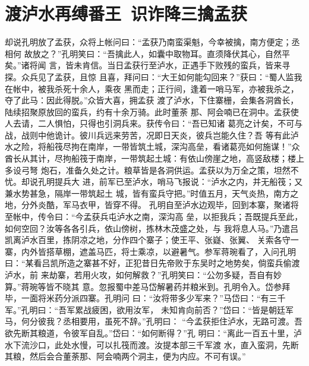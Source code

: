 \chapter{渡泸水再缚番王~识诈降三擒孟获}

却说孔明放了孟获，众将上帐问曰：“孟获乃南蛮渠魁，今幸被擒，南方便定；丞相何
故放之？”孔明笑曰：“吾擒此人，如囊中取物耳。直须降伏其心，自然平矣。”诸将闻
言，皆未肯信。当日孟获行至泸水，正遇手下败残的蛮兵，皆来寻探。众兵见了孟获，且惊
且喜，拜问曰：“大王如何能勾回来？”获曰：“蜀人监我在帐中，被我杀死十余人，乘夜
黑而走；正行间，逢着一哨马军，亦被我杀之，夺了此马：因此得脱。”众皆大喜，拥孟获
渡了泸水，下住寨栅，会集各洞酋长，陆续招聚原放回的蛮兵，约有十余万骑。此时董荼
那、阿会喃已在洞中。孟获使人去请，二人惧怕，只得也引洞兵来。获传令曰：“吾已知诸
葛亮之计矣，不可与战，战则中他诡计。彼川兵远来劳苦，况即日天炎，彼兵岂能久住？吾
等有此泸水之险，将船筏尽拘在南岸，一带皆筑土城，深沟高垒，看诸葛亮如何施谋！”众
酋长从其计，尽拘船筏于南岸，一带筑起土城：有依山傍崖之地，高竖敌楼；楼上多设弓弩
炮石，准备久处之计。粮草皆是各洞供运。孟获以为万全之策，坦然不忧。却说孔明提兵大
进，前军已至泸水，哨马飞报说：“泸水之内，并无船筏；又兼水势甚急，隔岸一带筑起土
城，皆有蛮兵守把。”时值五月，天气炎热，南方之地，分外炎酷，军马衣甲，皆穿不得。
孔明自至泸水边观毕，回到本寨，聚诸将至帐中，传令曰：“今孟获兵屯泸水之南，深沟高
垒，以拒我兵；吾既提兵至此，如何空回？汝等各各引兵，依山傍树，拣林木茂盛之处，与
我将息人马。”乃遣吕凯离泸水百里，拣阴凉之地，分作四个寨子；使王平、张嶷、张翼、
关索各守一寨，内外皆搭草棚，遮盖马匹，将士乘凉，以避暑气。参军蒋琬看了，入问孔明
曰：“某看吕凯所造之寨甚不好，正犯昔日先帝败于东吴时之地势矣，倘蛮兵偷渡泸水，前
来劫寨，若用火攻，如何解救？”孔明笑曰：“公勿多疑，吾自有妙算。”蒋琬等皆不晓其
意。忽报蜀中差马岱解暑药并粮米到。孔明令入。岱参拜毕，一面将米药分派四寨。孔明问
曰：“汝将带多少军来？”马岱曰：“有三千军。”孔明曰：“吾军累战疲困，欲用汝军，
未知肯向前否？”岱曰：“皆是朝廷军马，何分彼我？丞相要用，虽死不辞。”孔明曰：
“今孟获拒住泸水，无路可渡。吾欲先断其粮道，令彼军自乱。”岱曰：“如何断得？”孔
明曰：“离此一百五十里，泸水下流沙口，此处水慢，可以扎筏而渡。汝提本部三千军渡
水，直入蛮洞，先断其粮，然后会合董荼那、阿会喃两个洞主，便为内应。不可有误。”

